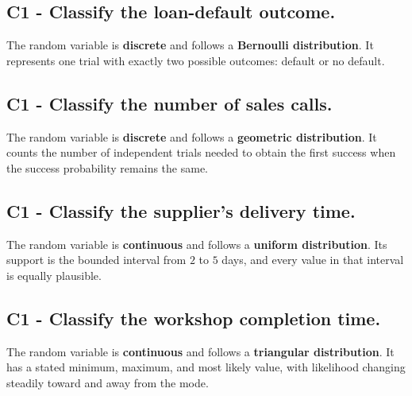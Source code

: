 {		
		\label{subsec:distribution-recognition-business-c1-a}
		\subsection*{C1 - Classify the loan-default outcome. }
		The random variable is \textbf{discrete} and follows a \textbf{Bernoulli distribution}. It represents one trial with exactly two possible outcomes: default or no default.
		
		\label{subsec:distribution-recognition-business-c1-b}
		\subsection*{C1 - Classify the number of sales calls. }
		The random variable is \textbf{discrete} and follows a \textbf{geometric distribution}. It counts the number of independent trials needed to obtain the first success when the success probability remains the same.
		
		\label{subsec:distribution-recognition-business-c1-c}
		\subsection*{C1 - Classify the supplier's delivery time. }
		The random variable is \textbf{continuous} and follows a \textbf{uniform distribution}. Its support is the bounded interval from $2$ to $5$ days, and every value in that interval is equally plausible.
		
		\label{subsec:distribution-recognition-business-c1-d}
		\subsection*{C1 - Classify the workshop completion time. }
		The random variable is \textbf{continuous} and follows a \textbf{triangular distribution}. It has a stated minimum, maximum, and most likely value, with likelihood changing steadily toward and away from the mode.
	}
	

